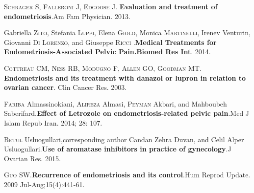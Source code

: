 \documentclass[12pt]{article} %
\begin{document}
\vspace{0,5cm}

\textsc{Schrager S, Falleroni J, Edgoose J}.\textbf{ Evaluation and treatment of endometriosis}.Am Fam Physician. 2013.

\vspace{0,5cm}

Gabriella\textsc{ Zito}, Stefania \textsc{Luppi}, Elena \textsc{Giolo}, Monica \textsc{Martinelli}, Irenev{ Venturin}, Giovanni \textsc{Di Lorenzo}, and Giuseppe \textsc{Ricci} .\textbf{Medical Treatments for Endometriosis-Associated Pelvic Pain.Biomed Res Int}. 2014.

\vspace{0,5cm}

\textsc{Cottreau CM, Ness RB, Modugno F, Allen GO, Goodman MT}. \textbf{Endometriosis and its treatment with danazol or lupron in relation to ovarian cancer}. Clin Cancer Res. 2003.

\vspace{0,5cm}

\textsc{Fariba} Almassinokiani, \textsc{Alireza} Almasi, \textsc{Peyman} Akbari, and Mahboubeh Saberifard.\textbf{Effect of Letrozole on endometriosis-related pelvic pain}.Med J Islam Repub Iran. 2014; 28: 107. 

\vspace{0,5cm}

\textsc{Betul} Usluogullari,corresponding author Candan Zehra Duvan, and Celil Alper Usluogullari.\textbf{Use of aromatase inhibitors in practice of gynecology}.J Ovarian Res. 2015.

\vspace{0,5cm}

\textsc{Guo} SW.\textbf{Recurrence of endometriosis and its control}.Hum Reprod Update. 2009 Jul-Aug;15(4):441-61.
\end{document}
